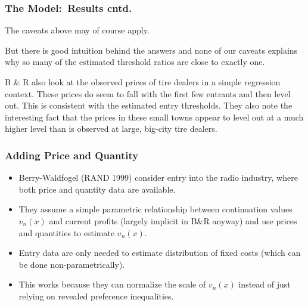 \documentclass[xcolor=pdftex,dvipsnames,table,mathserif]{beamer}
\begin{document}
\begin{frame}
\frametitle{The Model:\ Results cntd.}
The caveats above may of course apply.

\bigskip
But there is good intuition behind the answers and none of our caveats
explains why so many of the estimated threshold ratios are close to exactly
one.

\bigskip
B \& R also look at the observed prices of tire dealers in a simple
regression context. These prices do seem to fall with the first few entrants
and then level out. This is consistent with the estimated entry thresholds.
They also note the interesting fact that the prices in these small towns
appear to level out at a much higher level than is observed at large,
big-city tire dealers.
\end{frame}

\begin{frame} \frametitle{Adding Price and Quantity}
\begin{itemize}
\item Berry-Waldfogel (RAND 1999) consider entry into the radio industry,
where both price and quantity data are available.
\item They assume a simple parametric relationship between continuation
values $v_n(x)$ and current profits (largely implicit in B\&R anyway) and use
prices and quantities to estimate $v_n(x)$.
\item Entry data are only needed to estimate distribution of fixed costs (which can be done non-parametrically).
\item This works because they can normalize the scale of $v_n(x)$ instead of just relying on revealed preference inequalities.
\end{itemize}
\end{frame}
\end{document}
